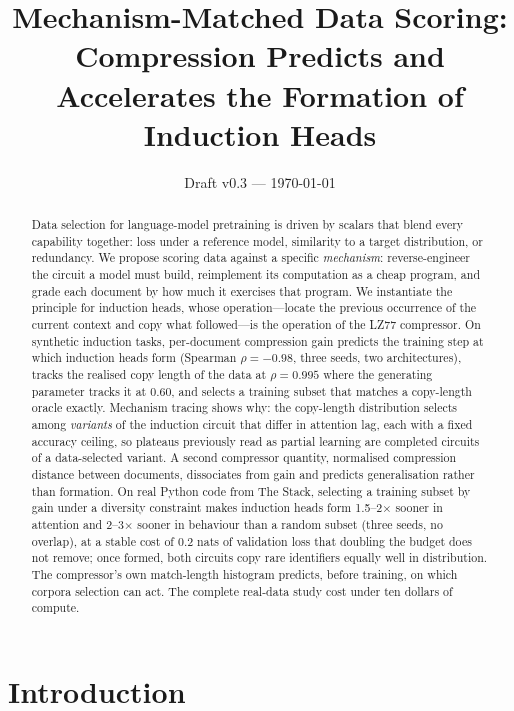 \documentclass[11pt]{article}
\title{Mechanism-Matched Data Scoring:\\
Compression Predicts and Accelerates the Formation of Induction Heads}
\author{\todo{author, affiliation, email}}
\date{Draft v0.3 --- \today}
\begin{document}
\maketitle

\begin{abstract}
Data selection for language-model pretraining is driven by scalars that
blend every capability together: loss under a reference model, similarity to
a target distribution, or redundancy. We propose scoring data against a
specific \emph{mechanism}: reverse-engineer the circuit a model must build,
reimplement its computation as a cheap program, and grade each document by
how much it exercises that program. We instantiate the principle for
induction heads, whose operation---locate the previous occurrence of the
current context and copy what followed---is the operation of the LZ77
compressor. On synthetic induction tasks, per-document compression gain
predicts the training step at which induction heads form
(Spearman $\rho=-0.98$, three seeds, two architectures), tracks the realised
copy length of the data at $\rho=0.995$ where the generating parameter
tracks it at $0.60$, and selects a training subset that matches a
copy-length oracle exactly. Mechanism tracing shows why: the copy-length
distribution selects among \emph{variants} of the induction circuit that
differ in attention lag, each with a fixed accuracy ceiling, so plateaus
previously read as partial learning are completed circuits of a
data-selected variant. A second compressor quantity, normalised compression
distance between documents, dissociates from gain and predicts
generalisation rather than formation. On real Python code from The Stack,
selecting a training subset by gain under a diversity constraint makes
induction heads form 1.5--2$\times$ sooner in attention and 2--3$\times$
sooner in behaviour than a random subset (three seeds, no overlap), at a
stable cost of 0.2 nats of validation loss that doubling the budget does not
remove; once formed, both circuits copy rare identifiers equally well in
distribution. The compressor's own match-length histogram predicts, before
training, on which corpora selection can act. The complete real-data study
cost under ten dollars of compute.
\end{abstract}

\section{Introduction}
\end{document}
